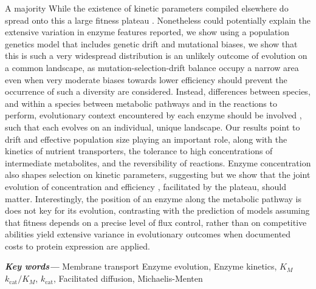 \documentclass[11pt,onecolumn]{article}
\providecommand{\keywords}[1]{\textbf{\textit{Key words---}} #1} %
\providecommand{\DIFadd}[1]{{\protect\color{blue} \sf #1}} %
\providecommand{\DIFdel}[1]{{\protect\color{red} \scriptsize #1}} %
\providecommand{\DIFaddbegin}{} %
\providecommand{\DIFaddend}{} %
\providecommand{\DIFdelbegin}{} %
\providecommand{\DIFdelend}{} %
\begin{document}
{\DIFdelbegin \DIFdel{A majority }\DIFdelend \DIFaddbegin \DIFadd{While the existence }\DIFaddend of \DIFdelbegin \DIFdel{kinetic parameters compiled elsewhere do spread onto this }\DIFdelend \DIFaddbegin \DIFadd{a large fitness }\DIFaddend plateau \DIFdelbegin \DIFdel{. Nonetheless}\DIFdelend \DIFaddbegin \DIFadd{could potentially explain the extensive variation in enzyme features reported}\DIFaddend , \DIFaddbegin \DIFadd{we show }\DIFaddend using a population genetics model that \DIFdelbegin \DIFdel{includes genetic drift and mutational biases, we show that this is }\DIFdelend \DIFaddbegin \DIFadd{such }\DIFaddend a \DIFdelbegin \DIFdel{very }\DIFdelend \DIFaddbegin \DIFadd{widespread distribution is an }\DIFaddend unlikely outcome of evolution on a common landscape, as \DIFaddbegin \DIFadd{mutation-selection-drift balance occupy a narrow area }\DIFaddend even \DIFaddbegin \DIFadd{when }\DIFaddend very moderate biases towards lower efficiency \DIFdelbegin \DIFdel{should prevent the occurrence of such a diversity}\DIFdelend \DIFaddbegin \DIFadd{are considered}\DIFaddend . Instead, differences \DIFdelbegin \DIFdel{between species, and within a species between metabolic pathways and }\DIFdelend \DIFaddbegin \DIFadd{in }\DIFaddend the \DIFdelbegin \DIFdel{reactions to perform, }\DIFdelend \DIFaddbegin \DIFadd{evolutionary context encountered by each enzyme }\DIFaddend should be involved\DIFaddbegin \DIFadd{, such that each evolves on an individual, unique landscape}\DIFaddend . Our results point to drift \DIFaddbegin \DIFadd{and effective population size }\DIFaddend playing an important role, along with the kinetics of nutrient transporters, the tolerance to high concentrations of intermediate metabolites, and the reversibility of reactions. Enzyme concentration also shapes selection on kinetic parameters, \DIFdelbegin \DIFdel{suggesting }\DIFdelend \DIFaddbegin \DIFadd{but we show }\DIFaddend that the joint evolution of concentration and efficiency \DIFdelbegin \DIFdel{, facilitated by the plateau, should matter. Interestingly, the position of an enzyme along the metabolic pathway is }\DIFdelend \DIFaddbegin \DIFadd{does }\DIFaddend not \DIFdelbegin \DIFdel{key for its evolution, contrasting with the prediction of models assuming that fitness depends on a precise level of flux control, rather than on competitive abilities}\DIFdelend \DIFaddbegin \DIFadd{yield extensive variance in evolutionary outcomes when documented costs to protein expression are applied}\DIFaddend .}

\keywords{\DIFdelbegin \DIFdel{Membrane transport}\DIFdelend \DIFaddbegin \DIFadd{Enzyme evolution}\DIFaddend , Enzyme kinetics, \DIFdelbegin \DIFdel{$K_M$}\DIFdelend \DIFaddbegin \DIFadd{$k_\text{cat}/K_M$}\DIFaddend , $k_\text{cat}$, Facilitated diffusion, Michaelis-Menten}
\vspace{0.5cm}
\end{document}
